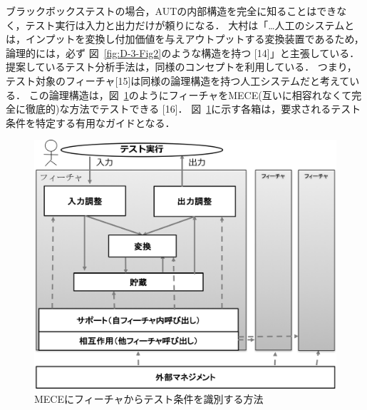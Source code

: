 \documentclass[a4paper,12pt]{jreport}
\begin{document}
ブラックボックステストの場合，AUTの内部構造を完全に知ることはできなく，テスト実行は入力と出力だけが頼りになる．
大村は「…人工のシステムとは，インプットを変換し付加価値を与えアウトプットする変換装置であるため，論理的には，必ず 図~\ref{fig:D-3-Fig2}のような構造を持つ [14]」と主張している．
提案しているテスト分析手法は，同様のコンセプトを利用している． つまり，テスト対象のフィーチャ[15]は同様の論理構造を持つ人工システムだと考えている．
この論理構造は，図~\ref{fig:D-3-Fig3}のようにフィーチャをMECE(互いに相容れなくて完全に徹底的)な方法でテストできる [16]． 図~\ref{fig:D-3-Fig3}に示す各箱は，要求されるテスト条件を特定する有用なガイドとなる．
\begin{figure}[h]
  \begin{center}
  \includegraphics[width=12cm]{./image/D-3-Fig3.png}
  \caption{MECEにフィーチャからテスト条件を識別する方法}
  \label{fig:D-3-Fig3}
  \end{center}
   \end{figure}
\end{document}

